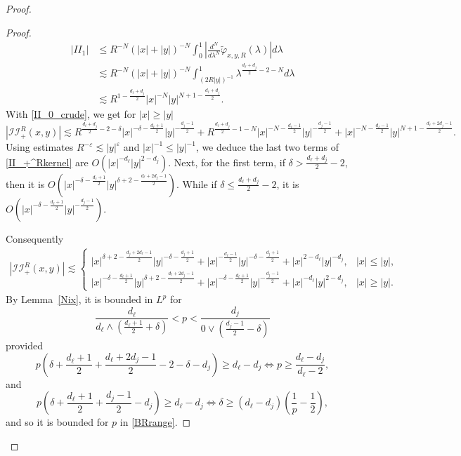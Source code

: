 \documentclass[12pt]{amsart}
\begin{document}
\begin{proof}
\begin{proof}
\begin{align*}
    |II_1|&\le R^{-N} \left( |x|+|y| \right)^{-N} \int_0^1 \left| \frac{d^N}{d\lambda^N}   \widetilde{\varphi}_{x,y,R}(\lambda)    \right| d\lambda\\
    &\lesssim R^{-N} \left( |x|+|y| \right)^{-N} \int_{(2R|y|)^{-1}}^1 \lambda^{\frac{d_\ell+d_j}{2}-2-N} d\lambda\\
    &\lesssim R^{1-\frac{d_\ell+d_j}{2}} |x|^{-N} |y|^{N+1-\frac{d_\ell+d_j}{2}}.
\end{align*}
With \eqref{II_0_crude}, we get for $|x|\ge |y|$
\begin{equation}\label{II_+^Rkernel}
    |\mathcal{II}_+^R(x,y)|\lesssim R^{\frac{d_\ell+d_j}{2}-2-\delta} |x|^{-\delta-\frac{d_\ell+1}{2}} |y|^{-\frac{d_j-1}{2}} + R^{\frac{d_\ell+d_j}{2}-1-N} |x|^{-N-\frac{d_\ell-1}{2}} |y|^{-\frac{d_j-1}{2}} + |x|^{-N-\frac{d_\ell-1}{2}} |y|^{N+1-\frac{d_\ell+2d_j-1}{2}}.
\end{equation}
Using estimates $R^{-\varepsilon}\lesssim |y|^\varepsilon$ and $|x|^{-1} \le |y|^{-1}$, we deduce the last two terms of \eqref{II_+^Rkernel} are $O\left(|x|^{-d_\ell}|y|^{2-d_j}\right)$. Next, for the first term, if $\delta > \frac{d_\ell+d_j}{2}-2$, then it is $O\left( |x|^{-\delta-\frac{d_\ell+1}{2}} |y|^{\delta+2-\frac{d_\ell+2d_j-1}{2}} \right)$. While if $\delta \le \frac{d_\ell+d_j}{2}-2$, it is $O\left( |x|^{-\delta-\frac{d_\ell+1}{2}} |y|^{-\frac{d_j-1}{2}} \right)$. 

Consequently
\begin{align*}
    |\mathcal{II}_+^R(x,y)|\lesssim \begin{cases} 
    |x|^{\delta+2-\frac{d_j+2d_\ell-1}{2}} |y|^{-\delta-\frac{d_j+1}{2}} + |x|^{-\frac{d_\ell-1}{2}} |y|^{-\delta-\frac{d_j+1}{2}} + |x|^{2-d_\ell} |y|^{-d_j}, & |x|\le |y|,\\
    |x|^{-\delta-\frac{d_\ell+1}{2}} |y|^{\delta+2-\frac{d_\ell+2d_j-1}{2}} + |x|^{-\delta-\frac{d_\ell+1}{2}} |y|^{-\frac{d_j-1}{2}} + |x|^{-d_\ell}|y|^{2-d_j}, & |x|\ge |y|.
    \end{cases}
\end{align*}
By Lemma~\ref{Nix}, it is bounded in $L^p$ for 
\begin{equation*}
    \frac{d_\ell}{d_\ell \wedge \left(\frac{d_\ell+1}{2}+\delta\right)} < p < \frac{d_j}{0 \vee \left(\frac{d_j-1}{2} - \delta\right)}
\end{equation*}
provided
\begin{equation*}
    p\left( \delta + \frac{d_\ell+1}{2} + \frac{d_\ell+2d_j-1}{2} - 2 -\delta -d_j\right) \ge d_\ell - d_j \iff p \ge \frac{d_\ell-d_j}{d_\ell-2},
\end{equation*}
and
\begin{equation*}
    p \left( \delta + \frac{d_\ell+1}{2} + \frac{d_j-1}{2} -d_j \right) \ge d_\ell-d_j \iff \delta \ge (d_\ell-d_j) \left( \frac{1}{p} - \frac{1}{2} \right),
\end{equation*}
and so it is bounded for $p$ in \eqref{BRrange}.


\end{proof}
\end{proof}
\end{document}
